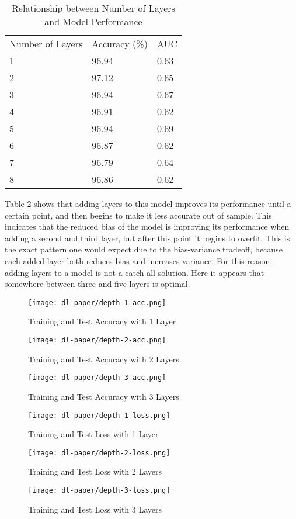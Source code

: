 \documentclass[12pt]{article}  %
\theoremstyle{definition}
\theoremstyle{remark}
\begin{document}
\begin{table}[]
\centering
\caption{Relationship between Number of Layers and Model Performance}
\label{my-label}
\begin{tabular}{lll}
Number of Layers & Accuracy (\%) & AUC  \\
1                & 96.94         & 0.63 \\
2                & 97.12         & 0.65 \\
3                & 96.94         & 0.67 \\
4                & 96.91         & 0.62 \\
5                & 96.94         & 0.69 \\
6                & 96.87         & 0.62 \\
7                & 96.79         & 0.64 \\
8                & 96.86         & 0.62
\end{tabular}
\end{table}

\par Table 2 shows that adding layers to this model improves its performance until a certain point, and then begins to make it less accurate out of sample. This indicates that the reduced bias of the model is improving its performance when adding a second and third layer, but after this point it begins to overfit. This is the exact pattern one would expect due to the bias-variance tradeoff, because each added layer both reduces bias and increases variance. For this reason, adding layers to a model is not a catch-all solution. Here it appears that somewhere between three and five layers is optimal. 

\begin{figure}[!htb]
  \texttt{[image: dl-paper/depth-1-acc.png]}
  \caption{Training and Test Accuracy with 1 Layer}\label{1-layer}
\endminipage\hfill
{}
  \texttt{[image: dl-paper/depth-2-acc.png]}
  \caption{Training and Test Accuracy with 2 Layers}\label{2-layers}
\endminipage\hfill
{}%
  \texttt{[image: dl-paper/depth-3-acc.png]}
  \caption{Training and Test Accuracy with 3 Layers}\label{3-layers}
\endminipage
\end{figure}


\begin{figure}[!htb]
  \texttt{[image: dl-paper/depth-1-loss.png]}
  \caption{Training and Test Loss with 1 Layer}\label{1-layers}
\endminipage\hfill
{}
  \texttt{[image: dl-paper/depth-2-loss.png]}
  \caption{Training and Test Loss with 2 Layers}\label{2-layers}
\endminipage\hfill
{}%
  \texttt{[image: dl-paper/depth-3-loss.png]}
  \caption{Training and Test Loss with 3 Layers}\label{3-layers}
\endminipage
\end{figure}
\end{document}
